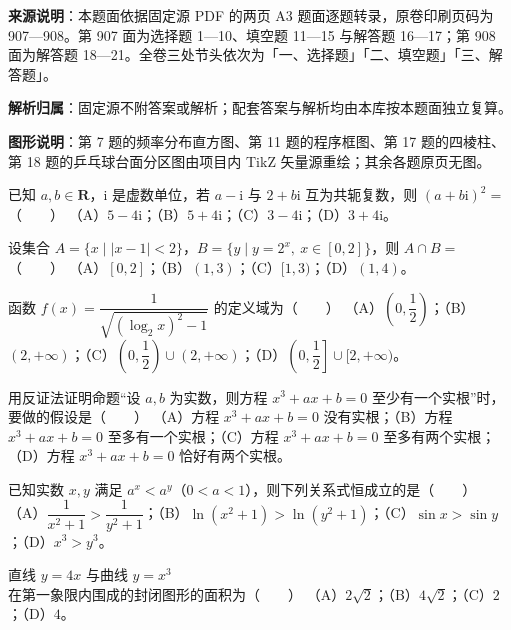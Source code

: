 \begin{gknotice}
\textbf{来源说明}：本题面依据固定源 PDF 的两页 A3 题面逐题转录，原卷印刷页码为 907—908。第 907 面为选择题 1—10、填空题 11—15 与解答题 16—17；第 908 面为解答题 18—21。全卷三处节头依次为「一、选择题」「二、填空题」「三、解答题」。

\textbf{解析归属}：固定源不附答案或解析；配套答案与解析均由本库按本题面独立复算。

\textbf{图形说明}：第 7 题的频率分布直方图、第 11 题的程序框图、第 17 题的四棱柱、第 18 题的乒乓球台面分区图由项目内 TikZ 矢量源重绘；其余各题原页无图。
\end{gknotice}
\begin{question}
已知 $a,b\in\mathbf R$，$\mathrm i$ 是虚数单位，若 $a-\mathrm i$ 与 $2+b\mathrm i$ 互为共轭复数，则 $(a+b\mathrm i)^2=$\mbox{（　　）}
（A）$5-4\mathrm i$；（B）$5+4\mathrm i$；（C）$3-4\mathrm i$；（D）$3+4\mathrm i$。
\end{question}
\begin{question}
设集合 $A=\{x\mid |x-1|<2\}$，$B=\{y\mid y=2^x,\ x\in[0,2]\}$，则 $A\cap B=$\mbox{（　　）}
（A）$[0,2]$；（B）$(1,3)$；（C）$[1,3)$；（D）$(1,4)$。
\end{question}
\begin{question}
函数 $f(x)=\dfrac1{\sqrt{(\log_2x)^2-1}}$ 的定义域为\mbox{（　　）}
（A）$\left(0,\dfrac12\right)$；（B）$(2,+\infty)$；（C）$\left(0,\dfrac12\right)\cup(2,+\infty)$；（D）$\left(0,\dfrac12\right]\cup[2,+\infty)$。
\end{question}
\begin{question}
用反证法证明命题“设 $a,b$ 为实数，则方程 $x^3+ax+b=0$ 至少有一个实根”时，要做的假设是\mbox{（　　）}
（A）方程 $x^3+ax+b=0$ 没有实根；（B）方程 $x^3+ax+b=0$ 至多有一个实根；（C）方程 $x^3+ax+b=0$ 至多有两个实根；（D）方程 $x^3+ax+b=0$ 恰好有两个实根。
\end{question}
\begin{question}
已知实数 $x,y$ 满足 $a^x<a^y$（$0<a<1$），则下列关系式恒成立的是\mbox{（　　）}
（A）$\dfrac1{x^2+1}>\dfrac1{y^2+1}$；（B）$\ln(x^2+1)>\ln(y^2+1)$；（C）$\sin x>\sin y$；（D）$x^3>y^3$。
\end{question}
\begin{question}
直线 $y=4x$ 与曲线 $y=x^3$ 在第一象限内围成的封闭图形的面积为\mbox{（　　）}
（A）$2\sqrt2$；（B）$4\sqrt2$；（C）$2$；（D）$4$。
\Needspace{0.4\textheight}
\end{question}
